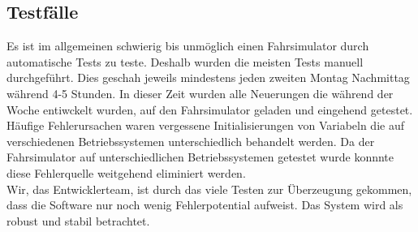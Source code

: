 \subsection{Testfälle}
Es ist im allgemeinen schwierig bis unmöglich einen Fahrsimulator durch automatische Tests zu teste. Deshalb wurden die meisten Tests manuell durchgeführt. Dies geschah jeweils mindestens jeden zweiten Montag Nachmittag während 4-5 Stunden. In dieser Zeit wurden alle Neuerungen die während der Woche entiwckelt wurden, auf den Fahrsimulator geladen und eingehend getestet. \\
Häufige Fehlerursachen waren vergessene Initialisierungen von Variabeln die auf verschiedenen Betriebssystemen unterschiedlich behandelt werden. Da der Fahrsimulator auf unterschiedlichen Betriebssystemen getestet wurde konnnte diese Fehlerquelle weitgehend eliminiert werden. \\
Wir, das Entwicklerteam, ist durch das viele Testen zur Überzeugung gekommen, dass die Software nur noch wenig Fehlerpotential aufweist. Das System wird als robust und stabil betrachtet. 